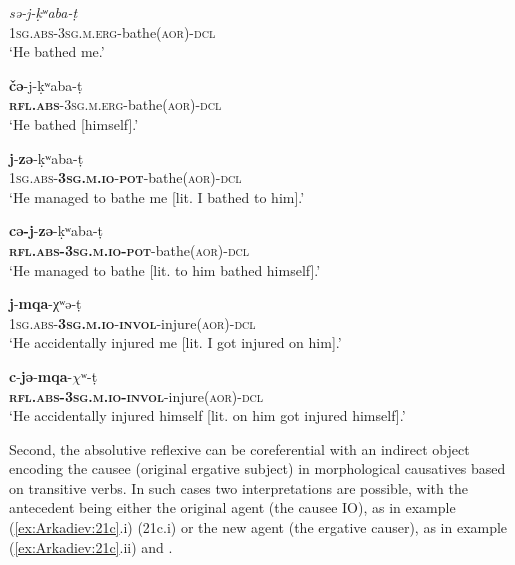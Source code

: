 \documentclass[output=paper]{langscibook}
\begin{document}
\ea 
\label{ex:Arkadiev:19}
    \ea 
    \label{ex:Arkadiev:19a}
    \gll \textit{s{ə}-j-k{̣}{ʷ}aba-t{̣}}\\
    \textsc{1sg.abs-3sg.m.erg}{}-bathe(\textsc{aor)-dcl} \\
    \glt   ‘He bathed me.’
    
    \ex 
    \label{ex:Arkadiev:19b}
    \gll \textbf{{č{ə}}}{{}-j-k{̣}{ʷ}aba-t{̣}}\\
    \textbf{\textsc{rfl.abs}}\textsc{{}-3sg.m.erg}{}-bathe(\textsc{aor)-dcl}\\
    \glt  ‘He bathed [himself].’
    
    \ex 
    \label{ex:Arkadiev:19c}
    \textbf{{j}}{{}-}\textbf{{z{ə}}}{{}-k{̣}{ʷ}aba-t{̣}}\\
       \textsc{1sg.abs-}\textbf{\textsc{3sg.m.io}}\textsc{{}-}\textbf{\textsc{pot}}{}-bathe(\textsc{aor)-dcl}\\
    \glt    ‘He managed to bathe me [lit. I bathed to him].’
    
    \ex 
    \label{ex:Arkadiev:19d}
    \gll   \textbf{{c{ə}-j}}{{}-}\textbf{{z{ə}}}{{}-k{̣}{ʷ}aba-t{̣}}\\
        \textbf{\textsc{rfl.abs-3sg.m.io-pot}}{}-bathe(\textsc{aor)-dcl}\\
    \glt  ‘He managed to bathe [lit. to him bathed himself].’
    \z
\z

 \ea 
\label{ex:Arkadiev:20}
    \ea 
    \label{ex:Arkadiev:20a}
    \textbf{{j}}{{}-}\textbf{{mqa}}{{}-χ{ʷ}{ə}-t{̣}}\\
    \textsc{1sg.abs-}\textbf{\textsc{3sg.m.io}}\textsc{{}-}\textbf{\textsc{invol}}{}-injure(\textsc{aor)-dcl}\\
    \glt  ‘He accidentally injured me [lit. I got injured on him].’
    
    \ex 
    \label{ex:Arkadiev:20b}
    \gll \textbf{{c}}{{}-}\textbf{{j{ə}}}{{}-}\textbf{{mqa}}{{}-$\chi {ʷ}$-t{̣}}\\
    \textbf{\textsc{rfl.abs-3sg.m.io-invol}}{}-injure(\textsc{aor)-dcl}\\
    \glt   ‘He accidentally injured himself [lit. on him got injured himself].’
    \z
\z



Second, the absolutive reflexive can be coreferential with an indirect object encoding the causee (original ergative subject) in morphological causatives based on transitive verbs. In such cases two interpretations are possible, with the antecedent being either the original agent (the causee IO), as in example (\ref{ex:Arkadiev:21c}.i) (21c.i) or the new agent (the ergative causer), as in example (\ref{ex:Arkadiev:21c}.ii) and .
\end{document}
